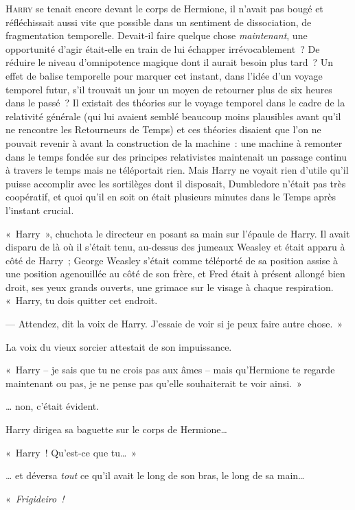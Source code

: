 
\lettrine{H}{arry} se tenait encore devant le corps de Hermione, il n'avait pas bougé et réfléchissait aussi vite que possible dans un sentiment de dissociation, de fragmentation temporelle. Devait-il faire quelque chose \emph{maintenant}, une opportunité d'agir était-elle en train de lui échapper irrévocablement~? De réduire le niveau d'omnipotence magique dont il aurait besoin plus tard~? Un effet de balise temporelle pour marquer cet instant, dans l'idée d'un voyage temporel futur, s'il trouvait un jour un moyen de retourner plus de six heures dans le passé~? Il existait des théories sur le voyage temporel dans le cadre de la relativité générale (qui lui avaient semblé beaucoup moins plausibles avant qu'il ne rencontre les Retourneurs de Temps) et ces théories disaient que l'on ne pouvait revenir à avant la construction de la machine~: une machine à remonter dans le temps fondée sur des principes relativistes maintenait un passage continu à travers le temps mais ne téléportait rien. Mais Harry ne voyait rien d'utile qu'il puisse accomplir avec les sortilèges dont il disposait, Dumbledore n'était pas très coopératif, et quoi qu'il en soit on était plusieurs minutes dans le Temps après l'instant crucial.

«~Harry~», chuchota le directeur en posant sa main sur l'épaule de Harry. Il avait disparu de là où il s'était tenu, au-dessus des jumeaux Weasley et était apparu à côté de Harry~; George Weasley s'était comme téléporté de sa position assise à une position agenouillée au côté de son frère, et Fred était à présent allongé bien droit, ses yeux grands ouverts, une grimace sur le visage à chaque respiration. «~Harry, tu dois quitter cet endroit.

--- Attendez, dit la voix de Harry. J'essaie de voir si je peux faire autre chose.~»

La voix du vieux sorcier attestait de son impuissance.

«~Harry -- je sais que tu ne crois pas aux âmes -- mais qu'Hermione te regarde maintenant ou pas, je ne pense pas qu'elle souhaiterait te voir ainsi.~»

… non, c'était évident.

Harry dirigea sa baguette sur le corps de Hermione…

«~Harry~! Qu'est-ce que tu…~»

… et déversa \emph{tout} ce qu'il avait le long de son bras, le long de sa main…

«~\emph{Frigideiro~!}

